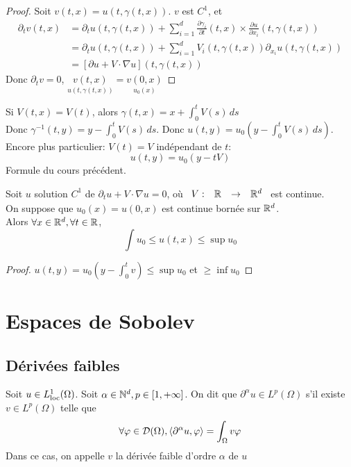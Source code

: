 \documentclass[]{report}
\begin{document}
    \begin{proof}
        Soit $v(t,x)=u(t,\gamma(t,x))$. $v$ est $C^1$, et
        \begin{align*}
            \partial_t v(t,x)&=\partial_t u(t,\gamma(t,x))+\sum_{i=1}^{d}\frac{\partial \gamma_i}{\partial t}(t,x)\times \frac{\partial u}{\partial x_i}(t,\gamma(t,x))\\
            &=\partial_t u(t,\gamma(t,x))+\sum_{i=1}^{d}V_i(t,\gamma(t,x))\partial_{x_i}u(t,\gamma(t,x))\\
            &=\left[\partial u+V\cdot\nabla u\right](t,\gamma(t,x))
        \end{align*}
        Donc $\partial_t v=0$, $\underset{u(t,\gamma(t,x))}{v(t,x)}=\underset{u_0(x)}{v(0,x)}$
    \end{proof}

    \begin{re}{}{}
        Si $V(t,x)=V(t)$, alors $\gamma(t,x)=x+\int_{0}^t V(s)\, ds$\\
        Donc $\gamma^{-1}(t,y)=y-\int_{0}^{t}V(s)\, ds$. Donc $u(t,y)=u_0(y-\int_{0}^{t}V(s)\, ds)$.\\
        Encore plus particulier: $V(t)=V$ indépendant de $t$:
        \[u(t,y)=u_0(y-tV)\]
        Formule du cours précédent.
    \end{re}

    \begin{tm}{}{}
        Soit $u$ solution $C^1$ de $\partial_t u+V\cdot \nabla u =0$, où $\begin{array}{ccccc} V : & \mathbb{R} & \to & \mathbb{R}^d \end{array}$ est continue. \\
        On suppose que $u_0(x)=u(0,x)$ est continue bornée sur $\mathbb{R}^d$.\\
        Alors $\forall x\in \mathbb{R}^d,\forall t\in \mathbb{R}$,
        \[\int u_0\le u(t,x)\le\sup u_0\]
    \end{tm}

    \begin{proof}
        $u(t,y)=u_0(y-\int_0^t v)\le \sup u_0$ et $\ge \inf u_0$
    \end{proof}

    \chapter{Espaces de Sobolev}

    \section{Dérivées faibles}

    \begin{df}{}{}
        Soit $u\in L^1_{\text{loc}}(\Omega)$. Soit $\alpha\in \mathbb{N}^d,p\in [1,+\infty]$. On dit que $\partial^\alpha u\in L^p(\Omega)$ s'il existe $v\in L^p(\Omega)$ telle que
        \[\forall \varphi\in \mathcal{D}(\Omega),\langle \partial^\alpha u,\varphi \rangle=\int_\Omega v\varphi\]
        Dans ce cas, on appelle $v$ la dérivée faible d'ordre $\alpha$ de $u$
    \end{df}
\end{document}
